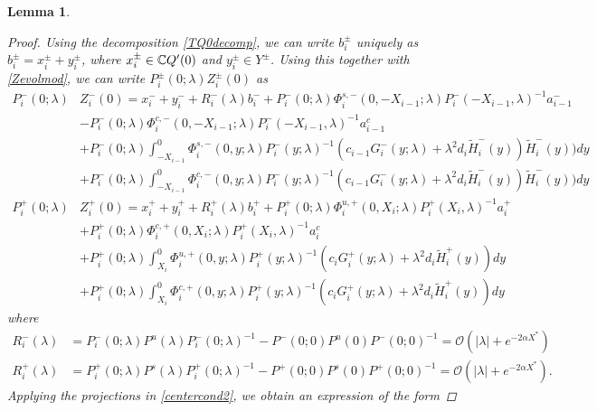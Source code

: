 \documentclass[10pt,reqno]{amsart}
\theoremstyle{plain}
\newtheorem{lemma}[theorem]{Lemma}
\theoremstyle{definition}
\theoremstyle{remark}
\numberwithin{theorem}{section}
\numberwithin{equation}{section}
\begin{document}
\begin{lemma}
\begin{proof}
Using the decomposition \cref{TQ0decomp}, we can write $b_i^\pm$ uniquely as $b_i^\pm = x_i^\pm + y_i^\pm$, where $x_i^\pm \in \mathbb{C} Q'(0)$ and $y_i^\pm \in Y^\pm$. Using this together with \cref{Zevolmod}, we can write $P_i^\pm(0; \lambda) Z_i^\pm(0)$ as
\begin{equation}\label{PipmZ0}
\begin{aligned}
P_i^-(0; \lambda) &Z_i^-(0) = x_i^- + y_i^- + R_i^-(\lambda) b_i^- + P_i^-(0; \lambda) \Phi_i^{s,-}(0, -X_{i-1}; \lambda) P_i^-(-X_{i-1}, \lambda)^{-1} a_{i-1}^- \\
&- P_i^-(0; \lambda) \Phi_i^{c,-}(0, -X_{i-1}; \lambda) P_i^-(-X_{i-1}, \lambda)^{-1} a_{i-1}^c \\
&+ P_i^-(0; \lambda) \int_{-X_{i-1}}^0 \Phi_i^{s,-}(0, y; \lambda) P_i^-(y; \lambda)^{-1} (c_{i-1} G_i^-(y; \lambda) + \lambda^2 d_i \tilde{H}_i^-(y)) \tilde{H}_i^-(y)) dy \\
&+ P_i^-(0; \lambda) \int_{-X_{i-1}}^0 \Phi_i^{c,-}(0, y; \lambda) P_i^-(y; \lambda)^{-1} (c_{i-1} G_i^-(y; \lambda) + \lambda^2 d_i \tilde{H}_i^-(y)) \tilde{H}_i^-(y)) dy  \\ 
P_i^+(0; \lambda) &Z_i^+(0) = x_i^+ + y_i^+ + R_i^+(\lambda) b_i^+ + P_i^+(0; \lambda) \Phi_i^{u,+}(0, X_i; \lambda) P_i^+(X_i, \lambda)^{-1} a_i^+ \\
&+ P_i^+(0; \lambda) \Phi_i^{c,+}(0, X_i; \lambda) P_i^+(X_i, \lambda)^{-1} a_i^c \\
&+ P_i^+(0; \lambda) \int_{X_i}^0 \Phi_i^{u,+}(0, y; \lambda) P_i^+(y; \lambda)^{-1}( c_i G_i^+(y; \lambda) + \lambda^2 d_i \tilde{H}_i^+(y)) dy \\
&+ P_i^+(0; \lambda) \int_{X_i}^0 \Phi_i^{c,+}(0, y; \lambda) P_i^+(y; \lambda)^{-1}( c_i G_i^+(y; \lambda) + \lambda^2 d_i \tilde{H}_i^+(y)) dy 
\end{aligned}
\end{equation}
where 
\begin{equation}\label{Ripmbound}
\begin{aligned}
R_i^-(\lambda) &= P_i^-(0; \lambda) P^u(\lambda) P_i^-(0; \lambda)^{-1} 
- P^-(0; 0) P^u(0) P^-(0; 0)^{-1} = \mathcal{O}(|\lambda| + e^{-2 \alpha X^*}) \\
R_i^+(\lambda) &= P_i^+(0; \lambda) P^s(\lambda) P_i^+(0; \lambda)^{-1} 
- P^+(0; 0) P^s(0) P^+(0; 0)^{-1} = \mathcal{O}(|\lambda| + e^{-2 \alpha X^*}).
\end{aligned}
\end{equation}
Applying the projections in \eqref{centercond2}, we obtain an expression of the form

\end{proof}
\end{lemma}
\end{document}

